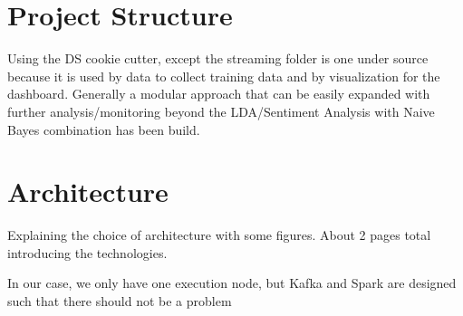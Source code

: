 \section{Project Structure}
\label{sec:projectStructure}


Using the DS cookie cutter, except the streaming folder is one under source because it is used by data to collect training data and by visualization for the dashboard.
Generally a modular approach that can be easily expanded with further analysis/monitoring beyond the LDA/Sentiment Analysis with Naive Bayes combination has been build.


\section{Architecture}
\label{sec:architecture}

Explaining the choice of architecture with some figures.
About 2 pages total introducing the technologies.


In our case, we only have one execution node, but Kafka and Spark are designed such that there should not be a problem
\pagebreak[2]